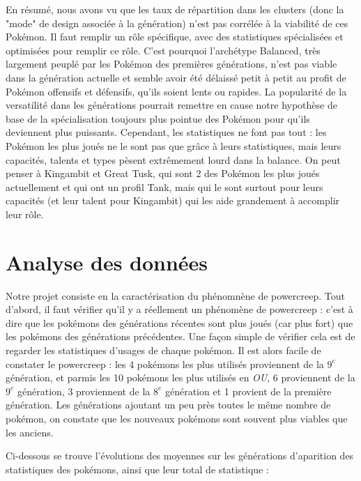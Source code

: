\documentclass[a4paper,12pt]{article}
\begin{document}
En résumé, nous avons vu que les taux de répartition dans les clusters (donc la
"mode" de design associée à la génération) n'est pas corrélée à la viabilité de
ces Pokémon. Il faut remplir un rôle spécifique, avec des statistiques
spécialisées et optimisées pour remplir ce rôle. C'est pourquoi l'archétype
Balanced, très largement peuplé par les Pokémon des premières générations, n'est
pas viable dans la génération actuelle et semble avoir été délaissé petit à
petit au profit de Pokémon offensifs et défensifs, qu'ils soient lents ou
rapides. La popularité de la versatilité dans les générations pourrait remettre
en cause notre hypothèse de base de la spécialisation toujours plus pointue des
Pokémon pour qu'ils deviennent plus puissants. Cependant, les statistiques ne
font pas tout : les Pokémon les plus joués ne le sont pas que grâce à leurs
statistiques, mais leurs capacités, talents et types pèsent extrêmement lourd
dans la balance. On peut penser à Kingambit et Great Tusk, qui sont 2 des
Pokémon les plus joués actuellement et qui ont un profil Tank, mais qui le sont
surtout pour leurs capacités (et leur talent pour Kingambit) qui les aide
grandement à accomplir leur rôle.

\section{Analyse des données}

Notre projet consiste en la caractérisation du phénomnène de powercreep. Tout
d'abord, il faut vérifier qu'il y a réellement un phénomène de powercreep :
c'est à dire que les pokémons des générations récentes sont plus joués (car plus
fort) que les pokémons des générations précédentes. Une façon simple de vérifier
cela est de regarder les statistiques d'usages de chaque pokémon. Il est alors
facile de constater le powercreep : les 4 pokémons les plus utilisés proviennent
de la $9^{e}$ génération, et parmis les 10 pokémons les plus utilisés en
\textit{OU}, 6 proviennent de la $9^{e}$ génération, 3 proviennent de la $8^{e}$
génération et 1 provient de la première génération. Les générations ajoutant un
peu près toutes le même nombre de pokémon, on constate que les nouveaux pokémons
sont souvent plus viables que les anciens.


Ci-dessous se trouve l'évolutions des moyennes sur les générations d'aparition
des statistiques des pokémons, ainsi que leur total de statistique :
\end{document}
